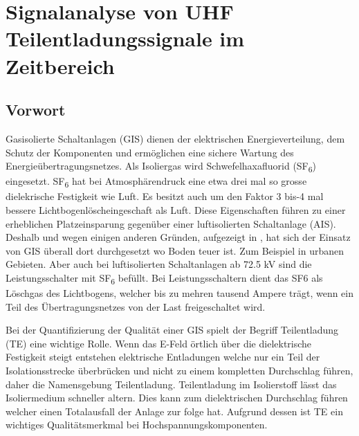 %
%
%
\chapter{Signalanalyse von UHF Teilentladungssignale im Zeitbereich \label{chapter:gis}}
\begin{refsection}

\section{Vorwort}

Gasisolierte Schaltanlagen (GIS) dienen der elektrischen Energieverteilung, dem Schutz der Komponenten und ermöglichen eine sichere Wartung des Energieübertragungsnetzes.
Als Isoliergas wird Schwefelhaxafluorid (SF\textsubscript{6}) eingesetzt. SF\textsubscript{6} hat bei Atmosphärendruck eine etwa drei mal so grosse dielekrische Festigkeit wie Luft. 
Es besitzt auch um den Faktor 3 bis-4 mal bessere Lichtbogenlöscheingeschaft als Luft. 
Diese Eigenschaften führen zu einer erheblichen Platzeinsparung gegenüber einer luftisolierten Schaltanlage (AIS). \cite{buch:ABB}
Deshalb und wegen einigen anderen Gründen, aufgezeigt in \cite{buch:GIS/AIS}, hat sich der Einsatz von GIS überall dort durchgesetzt wo Boden teuer ist. Zum Beispiel in urbanen Gebieten. Aber auch bei luftisolierten Schaltanlagen ab 72.5 kV sind die Leistungsschalter mit SF\textsubscript{6} befüllt. 
Bei Leistungsschaltern dient das SF6 als Löschgas des Lichtbogens, welcher bis zu mehren tausend Ampere trägt, wenn ein Teil des Übertragungsnetzes von der Last freigeschaltet wird. \cite{buch:ABB} 

Bei der Quantifizierung der Qualität einer GIS spielt der Begriff Teilentladung (TE) eine wichtige Rolle. 
Wenn das E-Feld örtlich über die dielektrische Festigkeit steigt entstehen elektrische Entladungen welche nur ein Teil der Isolationsstrecke überbrücken und nicht zu einem kompletten Durchschlag führen, daher die Namensgebung Teilentladung. \cite{buch:Kuchler}
Teilentladung im Isolierstoff lässt das Isoliermedium  schneller altern. Dies kann zum dielektrischen Durchschlag führen welcher einen Totalausfall der Anlage zur folge hat.
Aufgrund dessen ist TE ein wichtiges Qualitätsmerkmal bei Hochspannungskomponenten. 


\end{refsection}
